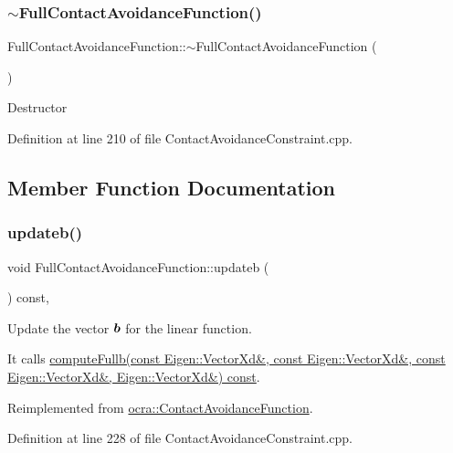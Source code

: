 \subsubsection{\texorpdfstring{$\sim$\+Full\+Contact\+Avoidance\+Function()}{~FullContactAvoidanceFunction()}}
{\footnotesize\ttfamily Full\+Contact\+Avoidance\+Function\+::$\sim$\+Full\+Contact\+Avoidance\+Function (\begin{DoxyParamCaption}{ }\end{DoxyParamCaption})}

Destructor 

Definition at line 210 of file Contact\+Avoidance\+Constraint.\+cpp.



\subsection{Member Function Documentation}
\hypertarget{classocra_1_1FullContactAvoidanceFunction_ae24690ecd464eefd43936907e33c4cb9}{}\label{classocra_1_1FullContactAvoidanceFunction_ae24690ecd464eefd43936907e33c4cb9} 
\subsubsection{\texorpdfstring{updateb()}{updateb()}}
{\footnotesize\ttfamily void Full\+Contact\+Avoidance\+Function\+::updateb (\begin{DoxyParamCaption}{ }\end{DoxyParamCaption}) const\hspace{0.3cm}{\ttfamily [protected]}, {\ttfamily [virtual]}}

Update the vector $ \mbox{\boldmath${b}$} $ for the linear function.

It calls \hyperlink{classocra_1_1ContactAvoidanceFunction_a9afd02871f0d26321b526290f565d541}{compute\+Fullb(const Eigen\+::\+Vector\+Xd\&, const Eigen\+::\+Vector\+Xd\&, const Eigen\+::\+Vector\+Xd\&, Eigen\+::\+Vector\+Xd\&) const}. 

Reimplemented from \hyperlink{classocra_1_1ContactAvoidanceFunction_aed2f145f17ff9fd8dd646018376ea7e9}{ocra\+::\+Contact\+Avoidance\+Function}.



Definition at line 228 of file Contact\+Avoidance\+Constraint.\+cpp.

